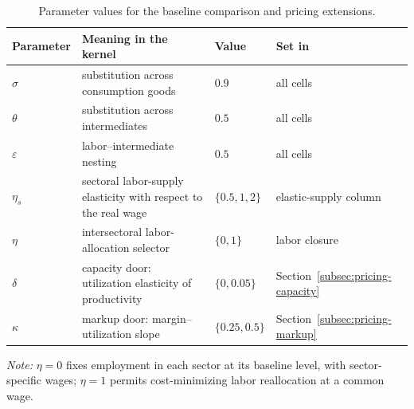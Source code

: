 \begin{table}[t]
\centering
\small
\begin{tabular}{@{}l p{5.9cm} l l@{}}
\toprule
Parameter & Meaning in the kernel & Value & Set in \\
\midrule
$\sigma$ & substitution across consumption goods & $0.9$ & all cells \\
$\theta$ & substitution across intermediates & $0.5$ & all cells \\
$\varepsilon$ & labor--intermediate nesting & $0.5$ & all cells \\
$\eta_s$ & sectoral labor-supply elasticity with respect to the real wage & $\{0.5,1,2\}$ & elastic-supply column \\
\addlinespace


$\eta$ & intersectoral labor-allocation selector & $\{0,1\}$ & labor closure \\
$\delta$ & capacity door: utilization elasticity of productivity & $\{0,0.05\}$ & Section~\ref{subsec:pricing-capacity} \\
$\kappa$ & markup door: margin--utilization slope & $\{0.25,0.5\}$ & Section~\ref{subsec:pricing-markup} \\

\bottomrule
\end{tabular}
\par\smallskip
\parbox{\textwidth}{\footnotesize
\textit{Note:} $\eta=0$ fixes employment in each sector at its baseline level,
with sector-specific wages; $\eta=1$ permits cost-minimizing labor
reallocation at a common wage.}
\caption{Parameter values for the baseline comparison and pricing extensions.}
\label{tab:parameters}
\end{table}
